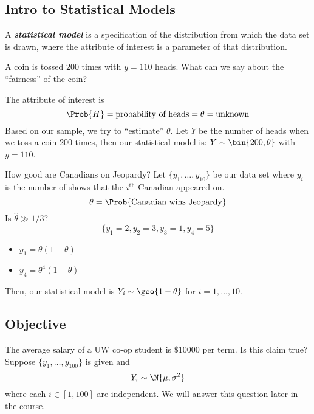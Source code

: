 \subsection*{Intro to Statistical Models}
\begin{Definition}{}{}
    A \textbf{\emph{statistical model}} is a specification of the
    distribution from which the data set is drawn, where the attribute of interest
    is a parameter of that distribution.
\end{Definition}
\begin{Example}{}{}
    A coin is tossed $ 200 $ times with $ y=110 $ heads. What can we say
    about the ``fairness'' of the coin?

    The attribute of interest is
    \[ \Prob{H}=\text{probability of heads}=\theta=\text{unknown} \]
    Based on our sample, we try to ``estimate'' $ \theta $.
    Let $ Y $ be the number of heads when we toss a coin $ 200 $ times,
    then our statistical model is: $ Y \sim \bin{200,\theta} $
    with $ y=110 $.
\end{Example}



\begin{Example}{}{}
    How good are Canadians on Jeopardy? Let $ \{y_1,\ldots ,y_{10}\} $
    be our data set where $ y_i $ is the number of shows that the
    $ i^{\text{th}} $ Canadian appeared on.
    \[ \theta=\Prob{\text{Canadian wins Jeopardy}} \]
    Is $ \hat{\theta}\gg 1/3 $?
    \[ \{y_1=2,y_2=3,y_3=1,y_4=5\} \]
    \begin{itemize}
        \item $ y_1=\theta(1-\theta) $
        \item $ y_4=\theta^4(1-\theta) $
    \end{itemize}
    Then, our statistical model is $ Y_i \sim \geo{1-\theta} $
    for $ i=1,\ldots ,10 $.
\end{Example}

\subsection*{Objective}
The average salary of a UW co-op student is $ \$10000 $ per term.
Is this claim true? Suppose $ \{y_1,\ldots ,y_{100}\} $ is given and
\[ Y_i \sim \N{\mu,\sigma^2} \]
where each $ i\in[1,100] $ are independent. We will answer this question later in the course.
